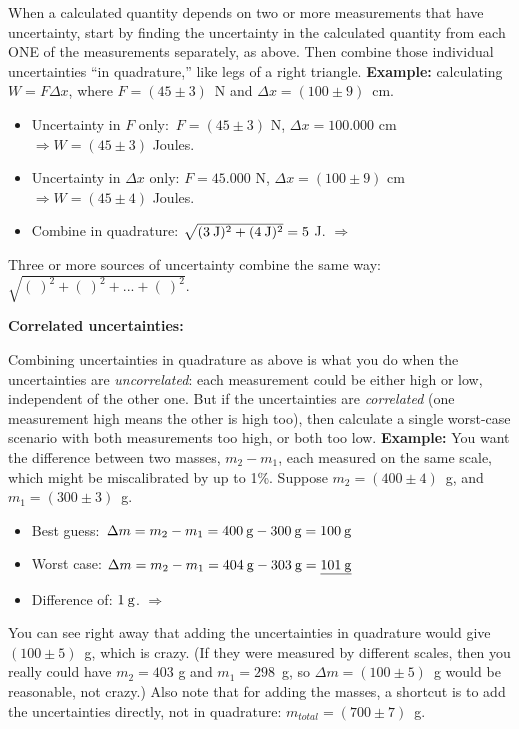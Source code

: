 When a calculated quantity depends on two or more measurements that have uncertainty, start by finding the uncertainty in the calculated quantity from each ONE of the measurements separately, as above.  Then combine those individual uncertainties ``in quadrature,'' like legs of a right triangle. \textbf{Example:} calculating $W=F \Delta x$, where $F=\left(45\pm3 \right)$~N and $\Delta x=(100\pm9)$~cm. 
\begin{itemize} \itemsep1pt
\vspace{-0.35cm}
	\item Uncertainty in $F$ only:   \:\:\,$F=(45\pm3)$ N, $\Delta x=100.000$ cm $\Longrightarrow W=(45\pm3)$ Joules.
	\item Uncertainty in $\Delta x$ only: $F=45.000$ N, $\Delta x=(100\pm9)$ cm $\Longrightarrow W=(45\pm4)$ Joules.
\vspace{-0.10cm}
		\item Combine in quadrature: $\sqrt{(3 \:\rm{J})^2+(4 \:\rm{J} )^2 } =5$ J.  $\Longrightarrow$ 
\end{itemize}
\vspace{-0.35cm}
Three or more sources of uncertainty combine the same way: $\sqrt{(\:)^2 + (\:)^2 +...+ (\:)^2 }$.
\vspace{+0.15cm}

\textbf{Correlated uncertainties:}
\vspace{-.8\parskip}

Combining uncertainties in quadrature as above is what you do when the uncertainties are \textit{uncorrelated}: each measurement could be either high or low, independent of the other one.  But if the uncertainties are \textit{correlated} (one measurement high means the other is high too), then calculate a single worst-case scenario with both measurements too high, or both too low. \textbf{Example:} You want the difference between two masses, $m_2-m_1$, each measured on the same scale, which might be miscalibrated by up to 1\%.  Suppose $m_2=(400\pm4)$~g, and $m_1=(300\pm3)$~g. 
\begin{itemize} \itemsep1pt
\vspace{-0.35cm}
	\item Best guess: $\,\Delta m=m_2-m_1=400 \:\rm{ g}-300 \:\rm{ g} = 100 \:\rm{ g}$
	\item Worst case: $  \Delta m=m_2-m_1=404 \:\rm{ g}-303 \:\rm{ g} = \underline{ 101 \:\rm{ g}}$
\vspace{-0.15cm}
	\item Difference of:           \hspace{15.1em}         $1 \:\rm{g}$. $\Longrightarrow$ 
\end{itemize}
\vspace{-0.35cm}
You can see right away that adding the uncertainties in quadrature would give $(100\pm5)$~g, which is crazy.  (If they were measured by different scales, then you really could have $m_2=403$ g and $m_1=298$~g, so $\Delta m=(100\pm 5)$~g would be reasonable, not crazy.)  Also note that for adding the masses, a shortcut is to add the uncertainties directly, not in quadrature: $m_{total}=(700\pm 7)$~g.
\vspace{+0.15cm}

